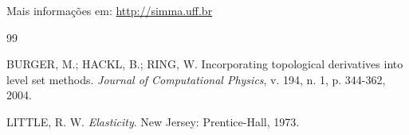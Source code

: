 \documentclass[a4paper,10pt]{article}
\begin{document}
Mais informações em: {\color{blue}\url{http://simma.uff.br}}


\begin{thebibliography}{99}

 BURGER, M.; HACKL, B.; RING, W. Incorporating topological derivatives
into level set methods. \emph{Journal of Computational Physics}, v. 194, n. 1, p. 344-362,
2004.

  LITTLE, R. W. \emph{Elasticity}. New Jersey: Prentice-Hall, 1973.

\end{thebibliography}
\end{document}
